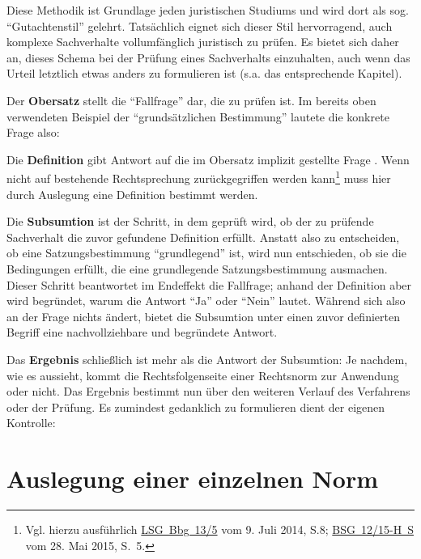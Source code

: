 Diese Methodik ist Grundlage jeden juristischen Studiums und wird dort als sog. \enquote{Gutachtenstil} gelehrt. Tatsächlich eignet sich dieser Stil hervorragend, auch komplexe Sachverhalte vollumfänglich juristisch zu prüfen. Es bietet sich daher an, dieses Schema bei der Prüfung eines Sachverhalts einzuhalten, auch wenn das Urteil letztlich etwas anders zu formulieren ist (s.a. das entsprechende Kapitel).

Der \textbf{Obersatz} stellt die \enquote{Fallfrage} dar, die zu prüfen ist. Im bereits oben verwendeten Beispiel der \enquote{grundsätzlichen Bestimmung} lautete die konkrete Frage also: 

Die \textbf{Definition} gibt Antwort auf die im Obersatz implizit gestellte Frage . Wenn nicht auf bestehende Rechtsprechung zurückgegriffen werden kann\footnote{Vgl. hierzu ausführlich \href{https://wiki.piratenbrandenburg.de/images/f/f2/LSG-Bbg-13-5\_Urteil\_2014\_07\_09.pdf}{LSG~Bbg~13/5} vom 9. Juli 2014, S.8; \href{http://piraten-bsg.de/git/BSG\%2012-15-H\%20S.pdf}{BSG~12/15-H~S} vom 28. Mai 2015, S.~5.} muss hier durch Auslegung eine Definition bestimmt werden.

Die \textbf{Subsumtion} ist der Schritt, in dem geprüft wird, ob der zu prüfende Sachverhalt die zuvor gefundene Definition erfüllt. Anstatt also zu entscheiden, ob eine Satzungsbestimmung \enquote{grundlegend} ist, wird nun entschieden, ob sie die Bedingungen erfüllt, die eine grundlegende Satzungsbestimmung ausmachen. Dieser Schritt beantwortet im Endeffekt die Fallfrage; anhand der Definition aber wird begründet, warum die Antwort \enquote{Ja} oder \enquote{Nein} lautet. Während sich also an der Frage nichts ändert, bietet die Subsumtion unter einen zuvor definierten Begriff eine nachvollziehbare und begründete Antwort.

Das \textbf{Ergebnis} schließlich ist mehr als die Antwort der Subsumtion: Je nachdem, wie es aussieht, kommt die Rechtsfolgenseite einer Rechtsnorm zur Anwendung oder nicht. Das Ergebnis bestimmt nun über den weiteren Verlauf des Verfahrens oder der Prüfung. Es zumindest gedanklich zu formulieren dient der eigenen Kontrolle: 

\section{Auslegung einer einzelnen Norm}
